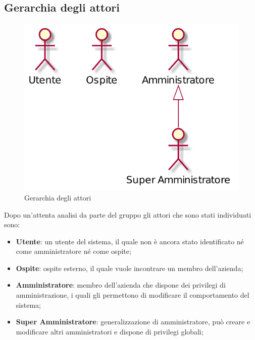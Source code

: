 \subsection{Gerarchia degli attori}
\begin{figure}[h]
  \centering
  \includegraphics[scale=0.4]{images/Attori.png}
  \caption{Gerarchia degli attori}
\end{figure}
Dopo un'attenta analisi da parte del gruppo gli attori che sono stati individuati sono: 
\begin{itemize}
\item \textbf{Utente}: un utente del sistema, il quale non è ancora stato identificato né come amministratore né come ospite;
\item \textbf{Ospite}: ospite esterno, il quale vuole incontrare un membro dell'azienda;
\item \textbf{Amministratore}: membro dell'azienda che dispone dei privilegi di amministrazione, i quali gli permettono di modificare il comportamento del sistema;
\item \textbf{Super Amministratore}: generalizzazione di amministratore, può creare e modificare altri amministratori e dispone di privilegi globali;
\end{itemize}